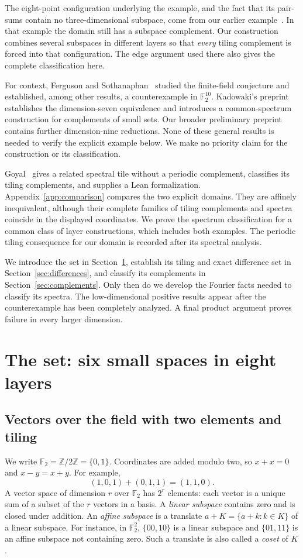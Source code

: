 \documentclass[11pt]{article}
\numberwithin{equation}{section}
\theoremstyle{definition}
\theoremstyle{remark}\newtheorem{remark}[theorem]{Remark}
\newcommand{\F}{\mathbb F_2}
\begin{document}
The eight-point configuration underlying the example, and the fact that its pair-sums contain no three-dimensional subspace, come from our earlier example~\cite[Proposition~7.1]{FI}. In that example the domain still has a subspace complement. Our construction combines several subspaces in different layers so that \emph{every} tiling complement is forced into that configuration. The edge argument used there also gives the complete classification here.

For context, Ferguson and Sothanaphan~\cite{FS} studied the finite-field conjecture and established, among other results, a counterexample in $\F^{10}$. Kadowaki's preprint~\cite{Kadowaki} establishes the dimension-seven equivalence and introduces a common-spectrum construction for complements of small sets. Our broader preliminary preprint~\cite{FIpreliminary} contains further dimension-nine reductions. None of these general results is needed to verify the explicit example below. We make no priority claim for the construction or its classification.

Goyal~\cite{Goyal} gives a related spectral tile without a periodic
complement, classifies its tiling complements, and supplies a Lean
formalization. Appendix~\ref{app:comparison} compares the two explicit
domains. They are affinely inequivalent, although their complete families
of tiling complements and spectra coincide in the displayed coordinates.
We prove the spectrum classification for a common class of layer
constructions, which includes both examples. The periodic tiling
consequence for our domain is recorded after its spectral analysis.

We introduce the set in Section~\ref{sec:construction}, establish its tiling and exact difference set in Section~\ref{sec:differences}, and classify its complements in Section~\ref{sec:complements}. Only then do we develop the Fourier facts needed to classify its spectra. The low-dimensional positive results appear after the counterexample has been completely analyzed. A final product argument proves failure in every larger dimension.

\section{The set: six small spaces in eight layers}\label{sec:construction}
\subsection{Vectors over the field with two elements and tiling}
We write $\F=\mathbb Z/2\mathbb Z=\{0,1\}$. Coordinates are added modulo two, so $x+x=0$ and $x-y=x+y$. For example,
\[
 (1,0,1)+(0,1,1)=(1,1,0).
\]
A vector space of dimension $r$ over $\F$ has $2^r$ elements: each vector is a unique sum of a subset of the $r$ vectors in a basis. A \emph{linear subspace} contains zero and is closed under addition. An \emph{affine subspace} is a translate $a+K=\{a+k:k\in K\}$ of a linear subspace. For instance, in $\F^2$, $\{00,10\}$ is a linear subspace and $\{01,11\}$ is an affine subspace not containing zero. Such a translate is also called a \emph{coset} of $K$.
\end{document}
